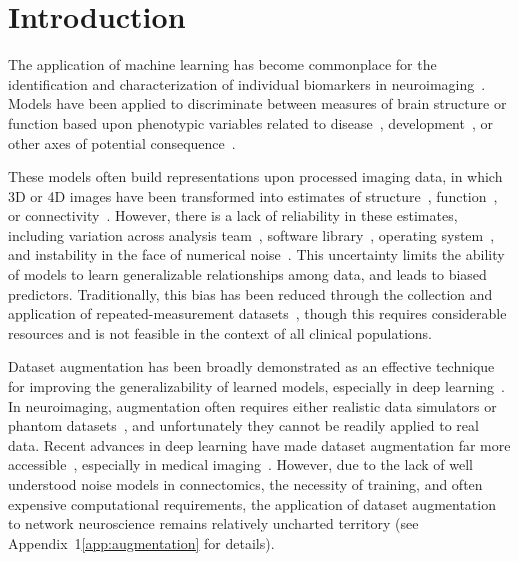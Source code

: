 \documentclass[10pt]{SelfArx} %
\affiliation{\textsuperscript{1}\textit{Montréal Neurological Institute, McGill University, Montréal, QC, Canada}}
\affiliation{\textsuperscript{2}\textit{Department of Computer Science and Software Engineering, Concordia University, Montréal, QC, Canada}}
\newcommand{\new}[1]{\color{blue}#1\color{black}}
\begin{document}
\flushbottom %
\maketitle %
\thispagestyle{empty} %

\pagestyle{fancy}
\section*{Introduction}

The application of machine learning has become commonplace for the identification and characterization of individual
biomarkers in neuroimaging~\cite{woo2017building}. Models have been applied to discriminate between measures of brain
structure or function based upon phenotypic variables related to
disease~\cite{Crossley2014-tg,Payabvash2019-tm,Tolan2018-nq}, development~\cite{Zhang2019-ko}, or other axes of
potential consequence~\cite{Zhu2018-cs,Park2015-uj}.

These models often build representations upon processed imaging data, in which 3D or 4D images have been transformed
into estimates of structure~\cite{wade2017machine}, function~\cite{weis2020sex}, or
connectivity~\cite{munsell2015evaluation}. However, there is a lack of reliability in these estimates, including
variation across analysis team~\cite{botvinik2020variability}, software library~\cite{bowring2019exploring}, operating
system~\cite{salari2020file}, and instability in the face of numerical noise~\cite{Kiar2020-kz}. This uncertainty
limits the ability of models to learn generalizable relationships among data, and leads to biased predictors.
Traditionally, this bias has been reduced through the collection and application of repeated-measurement
datasets~\cite{sudlow2015uk,zuo2014open}, though this requires considerable resources and is not feasible in the
context of all clinical populations.

\new{Dataset augmentation has been broadly demonstrated as an effective technique for improving the generalizability of
learned models, especially in deep learning~\cite{nalepa2019data}. In neuroimaging, augmentation often requires either
realistic data simulators or phantom datasets~\cite{graham2016realistic}, and unfortunately they cannot be readily
applied to real data. Recent advances in deep learning have made dataset augmentation far more
accessible~\cite{shorten2019survey}, especially in medical imaging~\cite{yi2019generative}. However, due to the lack of
well understood noise models in connectomics, the necessity of training, and often expensive computational
requirements, the application of dataset augmentation to network neuroscience remains relatively uncharted territory
(see Appendix~1\ref{app:augmentation} for details).}
\end{document}
